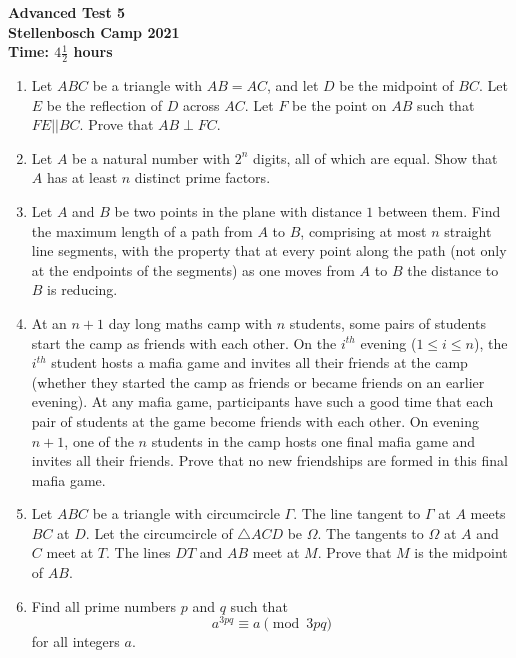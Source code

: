 \documentclass{article}
\begin{document}
\thispagestyle{empty}

\begin{center}
  \textbf{\Large Advanced Test 5}
  \\ \vspace{1em}
  \textbf{\large Stellenbosch Camp 2021}
  \\ \vspace{1em}
  \textbf{\large Time: $4\frac{1}{2}$ hours}
\end{center}

\bigskip

\begin{enumerate}[itemsep=\fill]

\item %
Let $ABC$ be a triangle with $AB=AC$, and let $D$ be the midpoint of $BC$. Let $E$ be the reflection of $D$ across $AC$. Let $F$ be the point on $AB$ such that $FE||BC$. Prove that $AB\perp FC$.


\item %
Let $A$ be a natural number with $2^n$ digits, all of which are equal. Show that $A$ has at least $n$ distinct prime factors.


\item %
Let $A$ and $B$ be two points in the plane with distance $1$ between them.
Find the maximum length of a path from $A$ to $B$, comprising at most $n$ straight line segments, with the property that at every point along the path (not only at the endpoints of the segments) as one moves from $A$ to $B$ the distance to $B$ is reducing.


\item %
At an $n+1$ day long maths camp with $n$ students, some pairs of students start the camp as friends with each other. On the $i^{th}$ evening ($1 \leq i \leq n$), the $i^{th}$ student hosts a mafia game and invites all their friends at the camp (whether they started the camp as friends or became friends on an earlier evening). At any mafia game, participants have such a good time that each pair of students at the game become friends with each other. On evening $n+1$, one of the $n$ students in the camp hosts one final mafia game and invites all their friends. Prove that no new friendships are formed in this final mafia game.


\item %
Let $ABC$ be a triangle with circumcircle $\Gamma$. The line tangent to $\Gamma$ at $A$ meets $BC$ at $D$. Let the circumcircle of $\triangle ACD$ be $\Omega$. The tangents to $\Omega$ at $A$ and $C$ meet at $T$. The lines $DT$ and $AB$ meet at $M$. Prove that $M$ is the midpoint of $AB$.


\item %
Find all prime numbers $p$ and $q$ such that
\[
  a^{3pq} \equiv a \pmod{3pq}
\]
for all integers $a$.

\end{enumerate}
\end{document}
